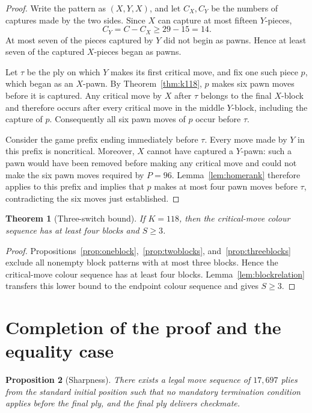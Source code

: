 \documentclass[11pt]{article}
\newtheorem{theorem}{Theorem}[section]
\newtheorem{proposition}[theorem]{Proposition}
\theoremstyle{definition}
\begin{document}
\begin{proof}
Write the pattern as $(X,Y,X)$, and let $C_X,C_Y$ be the numbers of captures
made by the two sides. Since $X$ can capture at most fifteen $Y$-pieces,
\[
  C_Y=C-C_X\ge29-15=14.
\]
At most seven of the pieces captured by $Y$ did not begin as pawns. Hence at
least seven of the captured $X$-pieces began as pawns.

Let $\tau$ be the ply on which $Y$ makes its first critical move, and fix
one such piece $p$,
which began as an $X$-pawn. By Theorem~\ref{thm:k118}, $p$ makes six pawn
moves before it is captured. Any critical move by $X$ after $\tau$ belongs to
the final $X$-block and therefore occurs after every critical move in the
middle $Y$-block, including the capture of $p$. Consequently all six pawn
moves of $p$ occur before $\tau$.

Consider the game prefix ending immediately before $\tau$. Every move made by
$Y$ in this prefix is noncritical. Moreover, $X$ cannot have captured a
$Y$-pawn:
such a pawn would have been removed before making any critical move and could
not make the six pawn moves required by $P=96$. Lemma~\ref{lem:homerank}
therefore applies to this prefix and implies that $p$ makes at most four pawn
moves before $\tau$, contradicting the six moves just established.
\end{proof}

\begin{theorem}[Three-switch bound]\label{thm:s3}
If $K=118$, then the critical-move colour sequence has at least four blocks
and $S\ge3$.
\end{theorem}

\begin{proof}
Propositions~\ref{prop:oneblock},~\ref{prop:twoblocks}, and~\ref{prop:threeblocks}
exclude all nonempty block patterns with at most three
blocks. Hence the critical-move colour sequence has at least four blocks.
Lemma~\ref{lem:blockrelation} transfers this lower bound to the endpoint
colour sequence and gives $S\ge3$.
\end{proof}

\section{Completion of the proof and the equality case}
\label{sec:maximum}

\begin{proposition}[Sharpness]\label{prop:sharpness}
There exists a legal move sequence of $17{,}697$ plies from the standard
initial position such that no mandatory termination condition applies before
the final ply, and the final ply delivers checkmate.
\end{proposition}
\end{document}
